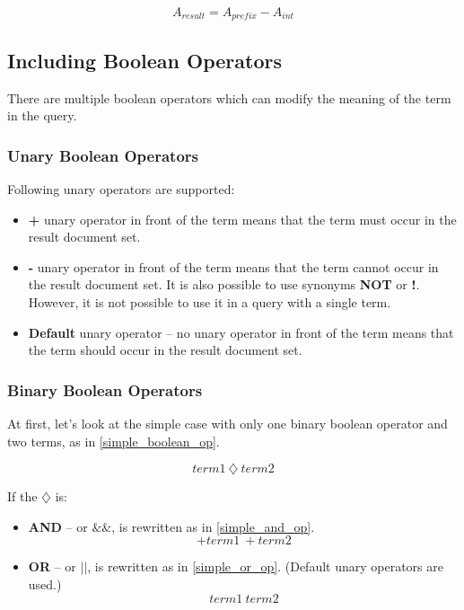 \begin{equation}
\label{ut_automaton}
A_{result} = A_{prefix} - A_{int}
\end{equation}

\subsection{Including Boolean Operators}
\label{boolean_ops}


There are multiple boolean operators which can modify the meaning of the term in the query.

\subsubsection{Unary Boolean Operators}
Following unary operators are supported:
\begin{itemize}
    \item \textbf{+} unary operator in front of the term means that the term must occur in the result document set.
    \item \textbf{-} unary operator in front of the term means that the term cannot occur in the result document set.
    It is also possible to use synonyms \textbf{NOT} or \textbf{!}. However, it is not possible to use it in a query
    with a single term.
    \item \textbf{Default} unary operator – no unary operator in front of the term means that the term should occur
    in the result document set.
\end{itemize}

\subsubsection{Binary Boolean Operators}

At first, let's look at the simple case with only one binary boolean operator and two terms, as in \ref{simple_boolean_op}.

\begin{equation}
\label{simple_boolean_op}
term1\ \diamondsuit \ term2
\end{equation}

If the $\diamondsuit$ is:
\begin{itemize}
    \item \textbf{AND} – or $\&\&$, is rewritten as in \ref{simple_and_op}.
    \begin{equation}
    \label{simple_and_op}
    +term1\ +term2
    \end{equation}
    \item \textbf{OR} – or $\vert\vert$, is rewritten as in \ref{simple_or_op}. (Default unary operators are used.)
    \begin{equation}
    \label{simple_or_op}
    term1\ term2
    \end{equation}
\end{itemize}

